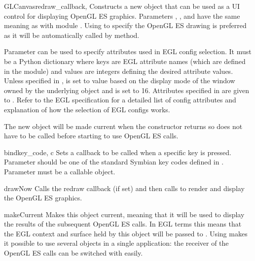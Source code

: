 \begin{classdesc}{GLCanvas}{redraw_callback, }
Constructs a new  object that can be used as a UI control for
displaying OpenGL ES graphics. Parameters ,
, and  have the same meaning as with
 module . Using  to specify
the OpenGL ES drawing is preferred as it will be automatically called by
 method.

Parameter  can be used to specify attributes used in EGL config
selection. It must be a Python dictionary where keys are EGL attribute names
(which are defined in the  module) and values are integers
defining the desired attribute values. Unless specified in ,
 is set to value based on the display mode of the window
owned by the underlying  object and  is
set to 16. Attributes specified in  are given to
. Refer to the EGL specification for a detailed list of
config attributes and explanation of how the selection of EGL configs works.

The new  object will be made current when the constructor
returns so  does not have to be called before starting to use
OpenGL ES calls.

\begin{methoddesc}[GLCanvas]{bind}{key_code, c}
Sets a callback to be called when a specific key is pressed. Parameter
 should be one of the standard Symbian key codes defined in
. Parameter  must be a callable object.
\end{methoddesc}

\begin{methoddesc}[GLCanvas]{drawNow}{}
Calls the redraw callback (if set) and then calls  to
render and display the OpenGL ES graphics.
\end{methoddesc}

\begin{methoddesc}[GLCanvas]{makeCurrent}{}
Makes this  object current, meaning that it will be used to
display the results of the subsequent OpenGL ES calls. In EGL terms this means
that the EGL context and surface held by this object will be passed to
. Using  makes it possible to use several
 objects in a single application: the receiver of the OpenGL ES
calls can be switched with  easily.
\end{methoddesc}
\end{classdesc}
